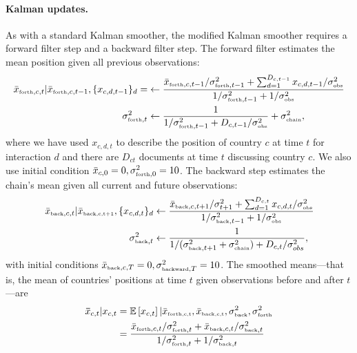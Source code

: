 \paragraph{Kalman updates.} As with a standard Kalman smoother, the
modified Kalman smoother requires a forward filter step and a backward
filter step.  The forward filter estimates the mean position given all
previous observations:
\begin{align}
  \bar x_{\mbox{\tiny forth},c,t} | \bar x_{\mbox{\tiny forth},c,t-1},
  \{ x_{c,d,t-1} \}_{d} =
  & \gets \frac{\bar x_{\mbox{\tiny forth},c,t-1} / \sigma_{\mbox{\tiny forth},t-1}^2
    + \sum_{d=1}^{D_{c,t-1}} x_{c,d,t-1} / \sigma_{\mbox{\tiny obs}}^2}
  {1 / \sigma_{\mbox{\tiny forth},t-1}^2 + 1 / \sigma_{\mbox{\tiny obs}}^2} \\
  \sigma_{\mbox{\tiny forth},t}^2
  & \gets \frac{1}{1 / \sigma_{\mbox{\tiny forth},t - 1}^2
    + D_{c,t-1} / \sigma_{\mbox{\tiny obs}}^2} + \sigma_{\mbox{\tiny chain}}^2,
\end{align}
where we have used $x_{c,d,t}$ to describe the position of country $c$
at time $t$ for interaction $d$ and there are $D_{ct}$ documents at
time $t$ discussing country $c$.  We also use initial condition $\bar
x_{c,0} = 0, \sigma_{\mbox{\tiny forth},0}^2=10$.  The backward step
estimates the chain's mean given all current and future observations:
\begin{align}
  \bar x_{\mbox{\tiny back},c,t} | \bar x_{\mbox{\tiny back,c,t+1}}, \{ x_{c,d,t} \}_d
  & \gets \frac{\bar x_{\mbox{\tiny back},c,t+1} / \sigma_{t+1}^2
    + \sum_{d=1}^{D_{c,t}} x_{c,d,t} / \sigma_{\mbox{\tiny obs}}^2}
  {1 / \sigma_{\mbox{\tiny back},t-1}^2 + 1 / \sigma_{\mbox{\tiny obs}}^2} \nonumber \\
  \sigma_{\mbox{\tiny back},t}^2
  & \gets \frac{1}{1 / (\sigma_{\mbox{\tiny back},t + 1}^2 + \sigma_{\mbox{\tiny chain}}^2)
    + D_{c,t} / \sigma_{\tiny obs}^2},
\end{align}
with initial conditions $\bar x_{\mbox{\tiny back},c,T} = 0,
\sigma_{\mbox{\tiny backward},T}^2=10$. The smoothed means---that is,
the mean of countries' positions at time $t$ given observations before
and after $t$---are
\begin{align}
  \bm \bar x_{c,t} | x_{c,t} & = \mathbb{E}\left[ x_{c,t}\right] | \bar x_{\mbox{\tiny forth,c,t}}, \bar x_{\mbox{\tiny back,c,t}}, \sigma_{\mbox{\tiny back}}^2, \sigma_{\mbox{\tiny forth}}^2 \nonumber \\
  & = \frac{\bar x_{\mbox{\tiny forth},c,t} / \sigma_{\mbox{\tiny forth},t}^2
    + \bar x_{\mbox{\tiny back},c,t} / \sigma_{\mbox{\tiny back},t}^2}
  {1 / \sigma_{\mbox{\tiny forth},t}^2
    + 1 / \sigma_{\mbox{\tiny back},t}^2}
\end{align}

